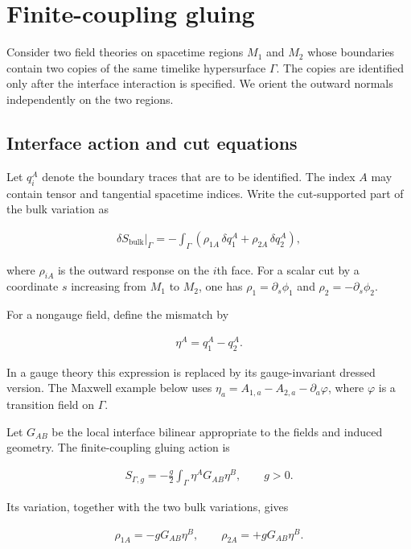 \section{Finite-coupling gluing}\label{sec:gluing-formalism}

Consider two field theories on spacetime regions $M_1$ and $M_2$ whose boundaries contain two copies of the same timelike hypersurface $\Gamma$. The copies are identified only after the interface interaction is specified. We orient the outward normals independently on the two regions.

\subsection{Interface action and cut equations}\label{subsec:interface-action}

Let $q_i^A$ denote the boundary traces that are to be identified. The index $A$ may contain tensor and tangential spacetime indices. Write the cut-supported part of the bulk variation as

\begin{align}
\delta S_{\mathrm{bulk}}\big|_{\Gamma}
=-\int_{\Gamma}\left(\rho_{1A}\,\delta q_1^A+\rho_{2A}\,\delta q_2^A\right),
\end{align}

where $\rho_{iA}$ is the outward response on the $i$th face. For a scalar cut by a coordinate $s$ increasing from $M_1$ to $M_2$, one has $\rho_1=\partial_s\phi_1$ and $\rho_2=-\partial_s\phi_2$.

For a nongauge field, define the mismatch by

\begin{align}
\eta^A=q_1^A-q_2^A.
\end{align}

In a gauge theory this expression is replaced by its gauge-invariant dressed version. The Maxwell example below uses $\eta_a=A_{1,a}-A_{2,a}-\partial_a\varphi$, where $\varphi$ is a transition field on $\Gamma$.

Let $G_{AB}$ be the local interface bilinear appropriate to the fields and induced geometry. The finite-coupling gluing action is

\begin{align}
S_{\Gamma,g}=-\frac{g}{2}\int_{\Gamma}\eta^A G_{AB}\eta^B,
\qquad g>0.
\end{align}

Its variation, together with the two bulk variations, gives

\begin{align}
\rho_{1A}=-gG_{AB}\eta^B,
\qquad
\rho_{2A}=+gG_{AB}\eta^B.
\end{align}

